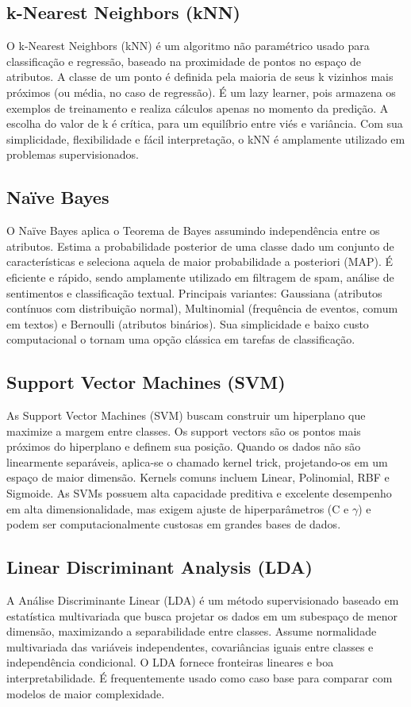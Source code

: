 \documentclass[english, spanish, brazilian]{RBIEarticle} %
\begin{document}
\subsection{k-Nearest Neighbors (kNN)}
O k-Nearest Neighbors (kNN) é um algoritmo não paramétrico usado para classificação e regressão, baseado na proximidade de pontos no espaço de atributos. A classe de um ponto é definida pela maioria de seus k vizinhos mais próximos (ou média, no caso de regressão). É um lazy learner, pois armazena os exemplos de treinamento e realiza cálculos apenas no momento da predição. A escolha do valor de k é crítica, para um equilíbrio entre viés e variância. Com sua simplicidade, flexibilidade e fácil interpretação, o kNN é amplamente utilizado em problemas supervisionados.

\subsection{Naïve Bayes}
O Naïve Bayes aplica o Teorema de Bayes assumindo independência entre os atributos. Estima a probabilidade posterior de uma classe dado um conjunto de características e seleciona aquela de maior probabilidade a posteriori (MAP). É eficiente e rápido, sendo amplamente utilizado em filtragem de spam, análise de sentimentos e classificação textual. Principais variantes: Gaussiana (atributos contínuos com distribuição normal), Multinomial (frequência de eventos, comum em textos) e Bernoulli (atributos binários). Sua simplicidade e baixo custo computacional o tornam uma opção clássica em tarefas de classificação.

\subsection{Support Vector Machines (SVM)}
As Support Vector Machines (SVM) buscam construir um hiperplano que maximize a margem entre classes. Os support vectors são os pontos mais próximos do hiperplano e definem sua posição. Quando os dados não são linearmente separáveis, aplica-se o chamado kernel trick, projetando-os em um espaço de maior dimensão. Kernels comuns incluem Linear, Polinomial, RBF e Sigmoide. As SVMs possuem alta capacidade preditiva e excelente desempenho em alta dimensionalidade, mas exigem ajuste de hiperparâmetros (C e \(\gamma\)) e podem ser computacionalmente custosas em grandes bases de dados.

\subsection{Linear Discriminant Analysis (LDA)}
A Análise Discriminante Linear (LDA) é um método supervisionado baseado em estatística multivariada que busca projetar os dados em um subespaço de menor dimensão, maximizando a separabilidade entre classes. Assume normalidade multivariada das variáveis independentes, covariâncias iguais entre classes e independência condicional. O LDA fornece fronteiras lineares e boa interpretabilidade. É frequentemente usado como caso base para comparar com modelos de maior complexidade.
\end{document}
